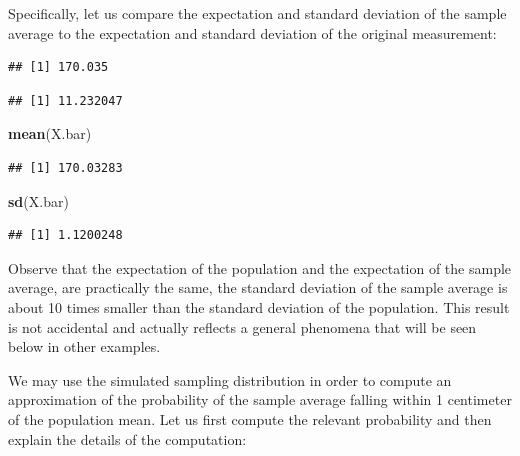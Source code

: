 \documentclass[]{krantz}
\makeatletter
\newenvironment{Shaded}{\begin{snugshade}}{\end{snugshade}}
\newcommand{\FloatTok}[1]{\textcolor[rgb]{0.00,0.00,0.81}{#1}}
\newcommand{\KeywordTok}[1]{\textcolor[rgb]{0.13,0.29,0.53}{\textbf{#1}}}
\newcommand{\NormalTok}[1]{#1}
\newcommand{\OperatorTok}[1]{\textcolor[rgb]{0.81,0.36,0.00}{\textbf{#1}}}
\newenvironment{kframe}{%
\medskip{}
\setlength{\fboxsep}{.8em}
 \def\at@end@of@kframe{}%
 \ifinner\ifhmode%
  \def\at@end@of@kframe{\end{minipage}}%
  \begin{minipage}{\columnwidth}%
 \fi\fi%
 \def\FrameCommand##1{\hskip\@totalleftmargin \hskip-\fboxsep
 \colorbox{shadecolor}{##1}\hskip-\fboxsep
     \hskip-\linewidth \hskip-\@totalleftmargin \hskip\columnwidth}%
 \MakeFramed {\advance\hsize-\width
   \@totalleftmargin\z@ \linewidth\hsize
   \@setminipage}}%
 {\par\unskip\endMakeFramed%
 \at@end@of@kframe}
\renewenvironment{Shaded}{\begin{kframe}}{\end{kframe}}
\theoremstyle{definition}
\theoremstyle{definition}
\theoremstyle{definition}
\theoremstyle{remark}
\makeatother
\begin{document}
Specifically, let us compare the expectation and standard deviation of
the sample average to the expectation and standard deviation of the
original measurement:

\begin{Shaded}
\end{Shaded}

\begin{verbatim}
## [1] 170.035
\end{verbatim}

\begin{Shaded}
\end{Shaded}

\begin{verbatim}
## [1] 11.232047
\end{verbatim}

\begin{Shaded}
\begin{Highlighting}[]
\KeywordTok{mean}\NormalTok{(X.bar)}
\end{Highlighting}
\end{Shaded}

\begin{verbatim}
## [1] 170.03283
\end{verbatim}

\begin{Shaded}
\begin{Highlighting}[]
\KeywordTok{sd}\NormalTok{(X.bar)}
\end{Highlighting}
\end{Shaded}

\begin{verbatim}
## [1] 1.1200248
\end{verbatim}

Observe that the expectation of the population and the expectation of
the sample average, are practically the same, the standard deviation of
the sample average is about 10 times smaller than the standard deviation
of the population. This result is not accidental and actually reflects a
general phenomena that will be seen below in other examples.

We may use the simulated sampling distribution in order to compute an
approximation of the probability of the sample average falling within 1
centimeter of the population mean. Let us first compute the relevant
probability and then explain the details of the computation:
\end{document}
